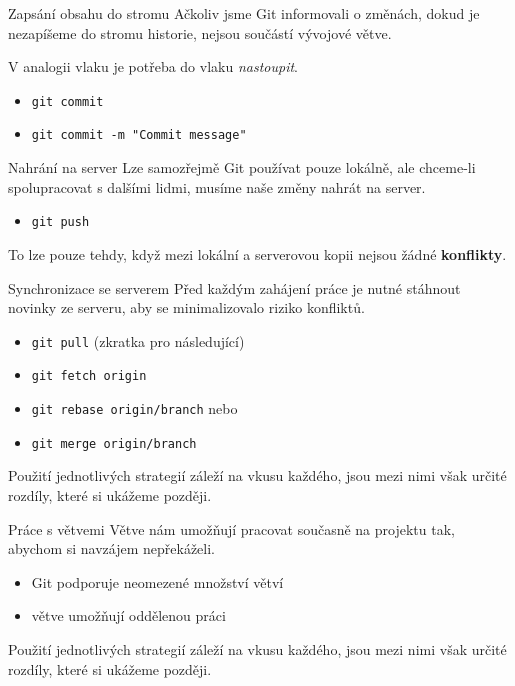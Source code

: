 \documentclass[14pt]{beamer}
\renewcommand{\texttt}[1]{{{\tt\color{blue}#1}}}
\begin{document}
	\begin{frame}{Zapsání obsahu do stromu}
	Ačkoliv jsme Git informovali o změnách, dokud je nezapíšeme do stromu
	historie, nejsou součástí vývojové větve.
	
	V analogii vlaku je potřeba do vlaku \textit{nastoupit}.

	\begin{itemize}
		\item \texttt{git commit}
		\item \texttt{git commit -m "Commit message"}
	\end{itemize}
	\end{frame}
	

	\begin{frame}{Nahrání na server}
		Lze samozřejmě Git používat pouze lokálně, ale chceme-li spolupracovat s dalšími lidmi, musíme naše změny nahrát na server.
	\begin{itemize}
		\item \texttt{git push}
	\end{itemize}
To lze pouze tehdy, když mezi lokální a serverovou kopii nejsou žádné \textbf{konflikty}.
	\end{frame}

	\begin{frame}{Synchronizace se serverem}
	Před každým zahájení práce je nutné stáhnout novinky ze serveru, aby se minimalizovalo riziko konfliktů.
	\begin{itemize}
		\item \texttt{git pull} (zkratka pro následující)
		\item \texttt{git fetch origin}
		\item \texttt{git rebase origin/branch} nebo
		\item \texttt{git merge origin/branch}
	\end{itemize}
	Použití jednotlivých strategií záleží na vkusu každého, jsou mezi nimi však určité rozdíly, které si ukážeme později.
	\end{frame}

	\begin{frame}{Práce s větvemi}
	Větve nám umožňují pracovat současně na projektu tak, abychom si navzájem nepřekáželi. 
	\begin{itemize}
		\item Git podporuje neomezené množství větví
		\item větve umožňují oddělenou práci
	\end{itemize}
	Použití jednotlivých strategií záleží na vkusu každého, jsou mezi nimi však určité rozdíly, které si ukážeme později.
	\end{frame}
\end{document}
